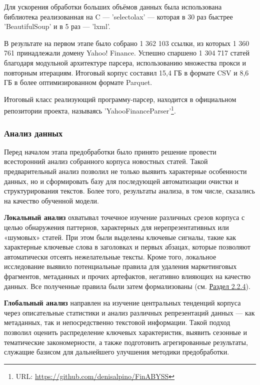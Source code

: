 Для ускорения обработки больших объёмов данных была использована библиотека реализованная на C --- 'selectolax' ---
которая в 30 раз быстрее 'BeautifulSoup' и в 5 раз — 'lxml'.

В результате на первом этапе было собрано 1 362 103 ссылки, из которых 1 360 761 принадлежали домену Yahoo! Finance.
Успешно спаршено 1 304 717 статей благодаря модульной архитектуре парсера, использованию множества прокси и повторным
итерациям. Итоговый корпус составил 15,4 ГБ в формате CSV и 8,6 ГБ в более оптимизированном формате Parquet.


Итоговый класс реализующий программу-парсер, находится в официальном репозитории проекта, называясь
'YahooFinanceParser'\footnote{URL: \url{https://github.com/denisalpino/FinABYSS}}.

\subsubsection{Анализ данных}
\label{sec:data_analysis}
Перед началом этапа предобработки было принято решение провести всесторонний анализ собранного корпуса новостных статей.
Такой предварительный анализ позволил не только выявить характерные особенности данных, но и сформировать базу для последующей
автоматизации очистки и структурирования текстов. Более того, результаты анализа, в том числе, сказались на качество обученной
модели.


\textbf{Локальный анализ} охватывал точечное изучение различных срезов корпуса с целью обнаружения паттернов,
характерных для нерепрезентативных или «шумовых» статей. При этом были выделены ключевые сигналы, такие как
характерные ключевые слова в заголовках и первых абзацах, которые позволяют автоматически отсеять нежелательные
тексты. Кроме того, локальное исследование выявило потенциальные правила для удаления маркетинговых фрагментов,
метаданных и прочих артефактов, негативно влияющих на качество данных. Все полученные правила были затем
формализованы (см. \hyperref[sec:data_prep]{Раздел 2.2.4}).

\textbf{Глобальный анализ} направлен на изучение центральных тенденций корпуса через описательные статистики
и анализ различных репрезентаций данных --- как метаданных, так и непосредственно текстовой информации.
Такой подход позволил оценить распределение ключевых характеристик, выявить сезонные и тематические
закономерности, а также подготовить агрегированные результаты, служащие базисом для дальнейшего улучшения
методики предобработки.

